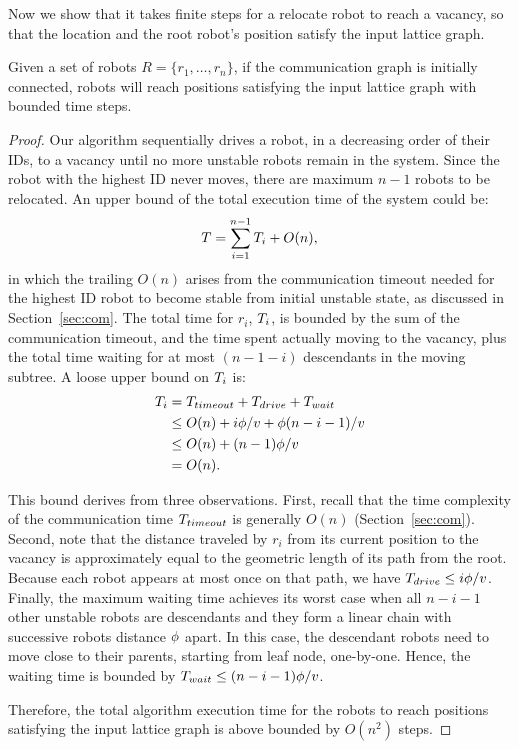 Now we show that it takes finite steps for a relocate robot to reach
a vacancy, so that the location and the root robot's position satisfy the
input lattice graph.

\begin{thm}
    Given a set of robots $R =\{r_1, \ldots, r_n\}$, if the
    communication graph is initially connected, robots will reach
    positions satisfying the input lattice graph with bounded time steps.
\end{thm}

\begin{proof}
    Our algorithm sequentially drives a robot, in a decreasing order of their IDs, to a vacancy until no more unstable robots remain in the system. 
    Since the robot with the highest ID never moves, there
    are maximum $n-1$ robots to be relocated. 
    An upper bound of the
    total execution time of the system could be:
      $$ T = \sum\limits_{i=1}^{n-1}T_i + O(n), $$
    in which the trailing $O(n)$ arises from the communication timeout needed
    for the highest ID robot to become stable from initial unstable state, as discussed in Section~\ref{sec:com}.
    The total time for $r_i$, $T_i$, is bounded by the sum of the
    communication timeout, and the time spent actually moving to the vacancy,
    plus the total time waiting for at most $(n-1-i)$ descendants in the moving
    subtree. 
    A loose upper bound on $T_i$ is:
    \begin{equation*}
     \label{eq:timebound}
      \begin{split}
        T_i & = T_{timeout} + T_{drive} + T_{wait}  \\
        & \leq O(n)+ i\phi/v + \phi(n-i-1)/v \\
        & \leq O(n) + (n-1)\phi/v\\
        & = O(n).
      \end{split}
    \end{equation*}
    
    This bound derives from three observations.
    First, recall that the time complexity of the communication time $T_{timeout}$ is generally $O(n)$ (Section~\ref{sec:com}).  
    Second, note that
    the distance traveled by $r_i$ from its current position to the vacancy is
    approximately equal to the geometric length of its path from the root.
    Because each robot appears at most once on that path, we have $T_{drive}\leq i\phi/v$. 
    Finally, the maximum waiting time achieves its
    worst case when all $n-i-1$ other unstable robots are descendants and they
    form a linear chain with successive robots distance $\phi$ apart.  
    In this case, the descendant robots need to move close to their parents,
    starting from leaf node, one-by-one. 
    Hence, the waiting time is bounded by
    $T_{wait}\leq(n-i-1)\phi/v$.
    
    Therefore, the total algorithm execution time for the robots to reach positions satisfying the input lattice graph
    is above bounded by $O(n^2)$ steps.
\end{proof}

